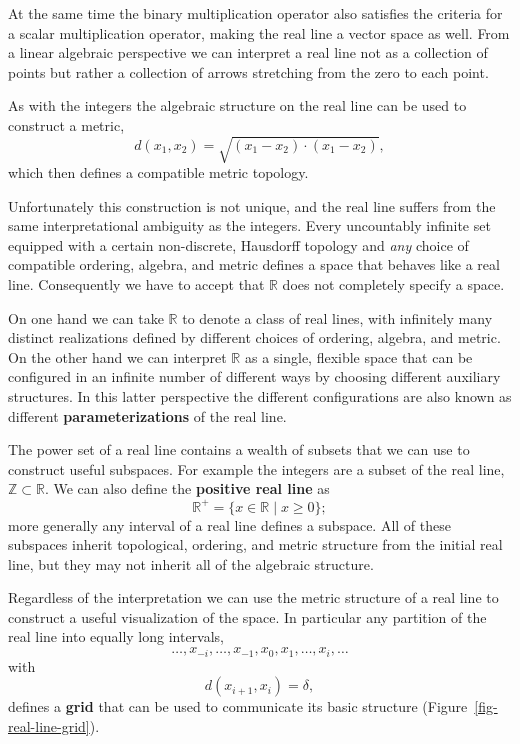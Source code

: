 \documentclass[
  letterpaper,
  DIV=11,
  numbers=noendperiod]{scrartcl}
\begin{document}
At the same time the binary multiplication operator also satisfies the
criteria for a scalar multiplication operator, making the real line a
vector space as well. From a linear algebraic perspective we can
interpret a real line not as a collection of points but rather a
collection of arrows stretching from the zero to each point.

As with the integers the algebraic structure on the real line can be
used to construct a metric, \[
d(x_{1}, x_{2}) = \sqrt{ (x_{1} - x_{2}) \cdot (x_{1} - x_{2}) },
\] which then defines a compatible metric topology.

Unfortunately this construction is not unique, and the real line suffers
from the same interpretational ambiguity as the integers. Every
uncountably infinite set equipped with a certain non-discrete, Hausdorff
topology and \emph{any} choice of compatible ordering, algebra, and
metric defines a space that behaves like a real line. Consequently we
have to accept that \(\mathbb{R}\) does not completely specify a space.

On one hand we can take \(\mathbb{R}\) to denote a class of real lines,
with infinitely many distinct realizations defined by different choices
of ordering, algebra, and metric. On the other hand we can interpret
\(\mathbb{R}\) as a single, flexible space that can be configured in an
infinite number of different ways by choosing different auxiliary
structures. In this latter perspective the different configurations are
also known as different \textbf{parameterizations} of the real line.

The power set of a real line contains a wealth of subsets that we can
use to construct useful subspaces. For example the integers are a subset
of the real line, \(\mathbb{Z} \subset \mathbb{R}\). We can also define
the \textbf{positive real line} as \[
\mathbb{R}^{+} = \{ x \in \mathbb{R} \mid x \ge 0 \};
\] more generally any interval of a real line defines a subspace. All of
these subspaces inherit topological, ordering, and metric structure from
the initial real line, but they may not inherit all of the algebraic
structure.

Regardless of the interpretation we can use the metric structure of a
real line to construct a useful visualization of the space. In
particular any partition of the real line into equally long intervals,
\[
\ldots, x_{-i}, \ldots, x_{-1}, x_{0}, x_{1}, \ldots, x_{i}, \ldots
\] with \[
d(x_{i + 1}, x_{i}) = \delta,
\] defines a \textbf{grid} that can be used to communicate its basic
structure (Figure~\ref{fig-real-line-grid}).
\end{document}
